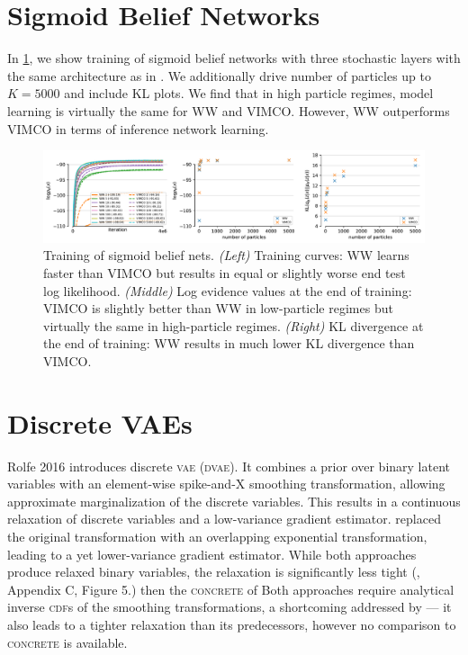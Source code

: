 \section{Sigmoid Belief Networks}
\label{app:sigmoid_belief_nets}

In \cref{fig:sbn}, we show training of sigmoid belief networks with three stochastic layers with the same architecture as in \citet{mnih2016variational}.
We additionally drive number of particles up to $K = 5000$ and include \gls{KL} plots.
We find that in high particle regimes, model learning is virtually the same for \gls{WW} and \gls{VIMCO}.
However, \gls{WW} outperforms \gls{VIMCO} in terms of inference network learning.

\begin{figure}[!ht]
  \includegraphics[width=\textwidth]{figures/RRWS/discrete_vae/rws_baselines.pdf}
  \vspace*{-4ex}
  \caption{
    Training of sigmoid belief nets.
    \emph{(Left)}
    Training curves:
    \gls{WW} learns faster than \gls{VIMCO} but results in equal or slightly worse end test log likelihood.
    \emph{(Middle)}
    Log evidence values at the end of training:
    \gls{VIMCO} is slightly better than \gls{WW} in low-particle regimes but virtually the same in high-particle regimes.
    \emph{(Right)}
    \gls{KL} divergence at the end of training:
    \gls{WW} results in much lower \gls{KL} divergence than \gls{VIMCO}.
  }
  \label{fig:sbn}
  \vspace*{-2ex}
\end{figure}

\section{Discrete VAEs}
\label{app:dvae}

Rolfe 2016 \citep{rolfe2016dvae} introduces discrete \textsc{vae} (\textsc{dvae}).
It combines a prior over binary latent variables with an element-wise spike-and-X smoothing transformation, allowing approximate marginalization of the discrete variables.
This results in a continuous relaxation of discrete variables and a low-variance gradient estimator.
\citet{vahdat2018dvaepp} replaced the original transformation with an overlapping exponential transformation, leading to a yet lower-variance gradient estimator.
While both approaches produce relaxed binary variables, the relaxation is  significantly less tight (\cite{vahdat2018dvaepp}, Appendix C, Figure 5.) then the \textsc{concrete} of \cite{jang2017categorical,maddison2017concrete}
Both approaches require analytical inverse \textsc{cdf}s of the smoothing transformations, a shortcoming addressed by \citet{vahdat2018dvaehash} --- it also leads to a tighter relaxation than its predecessors, however no comparison to \textsc{concrete} is available.

